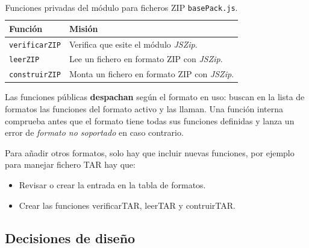 \begin{table}[h]
	\centering
	\begin{tabular}{|l|p{9cm}|}
		\hline
		\textbf{Función} & \textbf{Misión} \\ \hline
		\texttt{verificarZIP} & Verifica que esite el módulo \emph{JSZip}. \\ \hline
		\texttt{leerZIP} & Lee un fichero en formato ZIP con \emph{JSZip}. \\ 
		\hline
		\texttt{construirZIP} & Monta un fichero en formato ZIP con \emph{JSZip}. \\ \hline

	\end{tabular}
	\caption{Funciones privadas del módulo para ficheros ZIP \texttt{basePack.js}.}
\end{table}


Las funciones públicas \textbf{despachan} según el formato en uso: buscan en la lista de formatos las funciones del formato activo y las llaman. Una función interna comprueba antes que el formato tiene todas sus funciones definidas y lanza un error de \emph{formato no soportado} en caso contrario.

Para añadir otros formatos, solo hay que incluir nuevas funciones, por ejemplo para manejar fichero TAR hay que:
\begin{itemize}
	\item Revisar o crear la entrada en la tabla de formatos.
	\item Crear las funciones verificarTAR, leerTAR y contruirTAR.
\end{itemize} 

\subsection{Decisiones de diseño}
\label{sec:F5I11Decisiones}

